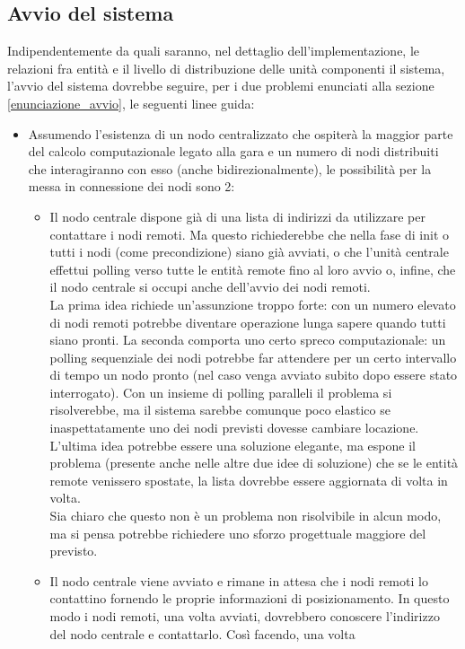 \subsection{Avvio del sistema}
Indipendentemente da quali saranno, nel dettaglio dell'implementazione, le relazioni fra entità e il livello di distribuzione
delle unità componenti il sistema, l'avvio del sistema dovrebbe seguire, per i due problemi enunciati alla sezione \ref{enunciazione_avvio},
le seguenti linee guida:
\begin{itemize}
\item Assumendo l'esistenza di un nodo centralizzato che ospiterà la maggior parte del calcolo computazionale legato alla gara e
un numero di nodi distribuiti che interagiranno con esso (anche bidirezionalmente), le possibilità per la messa in connessione
dei nodi sono 2:
\begin{itemize}
\item Il nodo centrale dispone già di una lista di indirizzi da utilizzare per contattare i nodi remoti. Ma questo richiederebbe
che nella fase di init o tutti i nodi (come precondizione) siano già avviati, o che l'unità centrale effettui polling verso tutte
le entità remote fino al loro avvio o, infine, che il nodo centrale si occupi anche dell'avvio dei nodi remoti. \\
La prima idea richiede un'assunzione troppo forte: con un numero elevato di nodi remoti potrebbe diventare operazione
lunga sapere quando tutti siano pronti. La seconda comporta uno certo spreco computazionale: un polling sequenziale dei nodi
potrebbe far attendere per un certo intervallo di tempo un nodo pronto (nel caso venga avviato subito dopo essere stato interrogato).
Con un insieme di polling paralleli il problema si risolverebbe, ma il sistema sarebbe comunque poco elastico se inaspettatamente
uno dei nodi previsti dovesse cambiare locazione.
L'ultima idea potrebbe essere una soluzione elegante, ma espone il problema (presente anche nelle altre due idee di soluzione)
che se le entità remote venissero spostate, la lista dovrebbe essere aggiornata di volta in volta.\\
Sia chiaro che questo non è un problema non risolvibile in alcun modo, ma si pensa potrebbe richiedere uno sforzo progettuale maggiore del previsto.
\item Il nodo centrale viene avviato e rimane in attesa che i nodi remoti lo contattino fornendo le proprie informazioni di posizionamento.
In questo modo i nodi remoti, una volta avviati, dovrebbero conoscere l'indirizzo del nodo centrale e contattarlo. Così facendo, una volta

\end{itemize}
\end{itemize}

